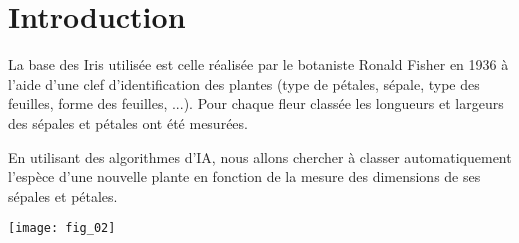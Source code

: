 \def\xxactivite{TD}
\def\xxauteur{\textsl{Xavier Pessoles}}

\def\xxnumchapitre{Chapitre 1 \vspace{.2cm}}
\def\xxchapitre{\hspace{.12cm} Introduction}


\def\xxtitreexo{Classification des Iris}
\def\xxsourceexo{\url{https://makina-corpus.com/blog/metier/2017/initiation-au-machine-learning-avec-python-pratique}}

\def\xxcompetences{%
\textsl{%
\textbf{Savoirs et compétences :}\\
\begin{itemize}[label=\ding{112},font=\color{ocre}] 
\item A voir
\end{itemize}
}}



\def\xxfigures{
\texttt{[image: fig\_01]}
}%

\iflivret

\else

\fi
\setlength{\columnseprule}{.1pt}

\vspace{4cm}
\pagestyle{fancy}
\thispagestyle{plain}


\section{Introduction}


\begin{minipage}[c]{.75\linewidth}
La base des Iris utilisée est celle réalisée par le botaniste Ronald Fisher en 1936 à l'aide d'une clef d'identification des plantes (type de pétales, sépale, type des feuilles, forme des feuilles, ...). Pour chaque fleur classée les longueurs et largeurs des sépales et pétales ont été mesurées.

En utilisant des algorithmes d'IA, nous allons chercher à classer automatiquement l'espèce d'une nouvelle plante en fonction de la mesure des dimensions de ses sépales et pétales.

\end{minipage}\hfill
\begin{minipage}[c]{.2\linewidth}
\begin{center}
\texttt{[image: fig\_02]}
\end{center}
\end{minipage}


